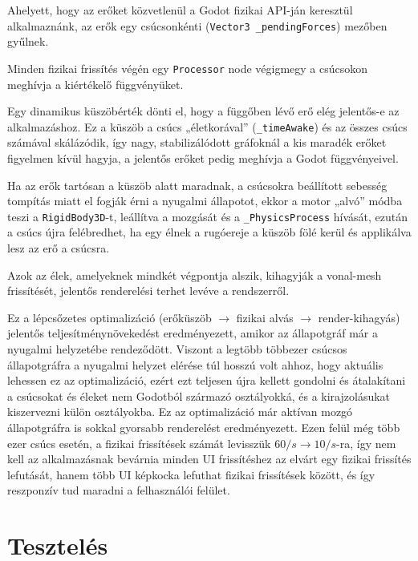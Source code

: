 \begin{compactenum}
\item Ahelyett, hogy az erőket közvetlenül a Godot fizikai API-ján keresztül alkalmaznánk, az erők egy csúcsonkénti (\texttt{Vector3 \_pendingForces}) mezőben gyűlnek.
\item Minden fizikai frissítés végén egy \texttt{Processor} node végigmegy a csúcsokon meghívja a kiértékelő függvényüket.
\item Egy dinamikus küszöbérték dönti el, hogy a függőben lévő erő elég jelentős-e az alkalmazáshoz. Ez a küszöb a csúcs „életkorával” (\texttt{\_timeAwake}) és az összes csúcs számával skálázódik, így nagy, stabilizálódott gráfoknál a kis maradék erőket figyelmen kívül hagyja, a jelentős erőket pedig meghívja a Godot függvényeivel.
\item Ha az erők tartósan a küszöb alatt maradnak, a csúcsokra beállított sebesség tompítás miatt el fogják érni a nyugalmi állapotot, ekkor a motor „alvó” módba teszi a \texttt{RigidBody3D}-t, leállítva a mozgását és a \texttt{\_PhysicsProcess} hívását, ezután a csúcs újra felébredhet, ha egy élnek a rugóereje a küszöb fölé kerül és applikálva lesz az erő a csúcsra.
\item Azok az élek, amelyeknek mindkét végpontja alszik, kihagyják a vonal-mesh frissítését, jelentős renderelési terhet levéve a rendszerről.
\end{compactenum}

Ez a lépcsőzetes optimalizáció (erőküszöb $\to$ fizikai alvás $\to$ render-kihagyás) jelentős teljesítménynövekedést eredményezett, amikor az állapotgráf már a nyugalmi helyzetébe rendeződött. Viszont a legtöbb többezer csúcsos állapotgráfra a nyugalmi helyzet elérése túl hosszú volt ahhoz, hogy aktuális lehessen ez az optimalizáció, ezért ezt teljesen újra kellett gondolni és átalakítani a csúcsokat és éleket nem Godotból származó osztályokká, és a kirajzolásukat kiszervezni külön osztályokba. Ez az optimalizáció már aktívan mozgó állapotgráfra is sokkal gyorsabb renderelést eredményezett. Ezen felül még több ezer csúcs esetén, a fizikai frissítések számát levisszük $60/s \rightarrow 10/s$-ra, így nem kell az alkalmazásnak bevárnia minden UI frissítéshez az elvárt egy fizikai frissítés lefutását, hanem több UI képkocka lefuthat fizikai frissítések között, és így reszponzív tud maradni a felhasználói felület.

\section{Tesztelés}

